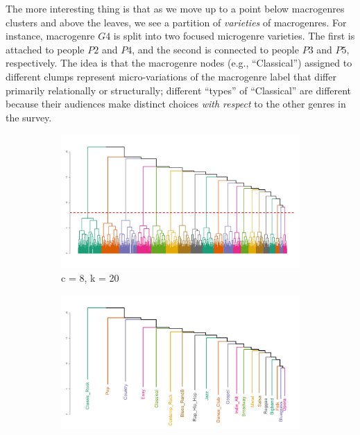 \documentclass[a4paper,12pt]{extarticle}
\begin{document}
The more interesting thing is that as we move up to a point below macrogenres clusters and above the leaves, we see a partition of {\em varieties} of macrogenres. For instance, macrogenre $G4$ is split into two focused microgenre varieties. The first is attached to people $P2$ and $P4$, and the second is connected to people $P3$ and $P5$, respectively. The idea is that the macrogenre nodes (e.g., ``Classical'') assigned to different clumps represent micro-variations of the macrogenre label that differ primarily relationally or structurally; different ``types'' of ``Classical'' are different because their audiences make distinct choices {\em with respect} to the other genres in the survey. 

\begin{figure}[t!]
     \begin{subfigure}[b]{0.5\textwidth}
        \centering
        \includegraphics[width=1.0\textwidth]{Plots/Dend/macro.png}
        \caption{c = 8, k = 20}
        \label{fig:dend-macro}
    \end{subfigure} 
     \begin{subfigure}[b]{0.5\textwidth}
        \centering
        \includegraphics[width=1.0\textwidth]{Plots/Dend/macro-lab.png}

\end{subfigure}
\end{figure}
\end{document}
